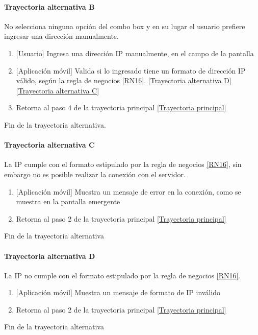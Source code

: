 \paragraph{Trayectoria alternativa B} \label{SUB-U-CU1.7:TB}
	No selecciona ninguna opción del combo box y en su lugar el usuario prefiere ingresar una dirección manualmente.
	\begin{enumerate}[label=A\arabic*.]
		\item {[Usuario]}  Ingresa una dirección IP manualmente, en el campo de la pantalla %
		\item {[Aplicación móvil]} Valida si lo ingresado tiene un formato de dirección IP válido, según la regla de negocios \ref{RN16}. \hyperref[SUB-U-CU1.7:TD]{[Trayectoria alternativa D]} \hyperref[SUB-U-CU1.7:TC]{[Trayectoria alternativa C]}
		\item Retorna al paso 4 de la trayectoria principal \hyperref[SUB-U-CU1.7:TPr]{[Trayectoria principal]}
	\end{enumerate}
	Fin de la trayectoria alternativa.

\paragraph{Trayectoria alternativa C} \label{SUB-U-CU1.7:TC}
    La IP cumple con el formato estipulado por la regla de negocios \ref{RN16}, sin embargo no es posible realizar la conexión con el servidor.
    \begin{enumerate}[label=A\arabic*.]
		\item {[Aplicación móvil]} Muestra un mensaje de error en la conexión, como se muestra en la pantalla emergente %
		\item Retorna al paso 2 de la trayectoria principal \hyperref[SUB-U-CU1.7:TPr]{[Trayectoria principal]}
	\end{enumerate}
	Fin de la trayectoria alternativa
	
\paragraph{Trayectoria alternativa D} \label{SUB-U-CU1.7:TD}
    La IP no cumple con el formato estipulado por la regla de negocios \ref{RN16}.
    \begin{enumerate}[label=A\arabic*.]
		\item {[Aplicación móvil]} Muestra un mensaje de formato de IP inválido
		\item Retorna al paso 2 de la trayectoria principal \hyperref[SUB-U-CU1.7:TPr]{[Trayectoria principal]}
	\end{enumerate}
	Fin de la trayectoria alternativa